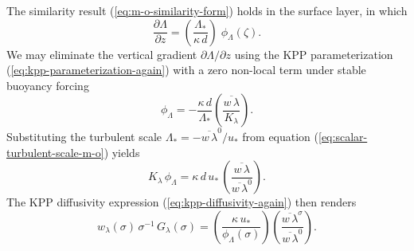 The similarity result (\ref{eq:m-o-similarity-form}) holds in the
surface layer, in which
\begin{equation}
  \frac{\partial \Lambda}{\partial z} = \left( \frac{\Lambda_{*}}{\kappa \, d} \right) \; \phi_{\Lambda}(\zeta).
\label{eq:m-o-similarity-form-again}
\end{equation}
We may eliminate the vertical gradient $\partial \Lambda/ \partial z$
using the KPP parameterization (\ref{eq:kpp-parameterization-again})
with a zero non-local term under stable buoyancy forcing
\begin{equation}
 \phi_{\Lambda} = -\frac{\kappa \, d}{\Lambda_{*}} \left( \frac{\overline{w \, \lambda}}{K_{\lambda}} \right).
\end{equation}
Substituting the turbulent scale $\Lambda_{*} =-\overline{w \,
  \lambda}^{0}/ u_{*}$ from equation
(\ref{eq:scalar-turbulent-scale-m-o}) yields
\begin{equation}
 K_{\lambda} \, \phi_{\Lambda} = \kappa \, d \, u_{*} \, \left( \frac{\overline{w \, \lambda}} {\overline{w \, \lambda}^{0} } \right).
\end{equation}
The KPP diffusivity expression (\ref{eq:kpp-diffusivity-again}) then
renders
\begin{equation}
 w_{\lambda}(\sigma) \, \sigma^{-1} \, G_{\lambda}(\sigma) = 
 \left(  \frac{\kappa \, u_{*}}{\phi_{\Lambda}(\sigma) }  \right) 
 \left( \frac{ \overline{w \, \lambda}^{\sigma}}{ \overline{w \, \lambda}^{0}}\right).
\end{equation}

